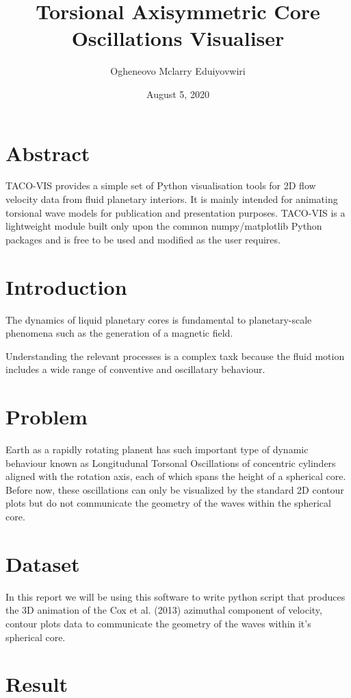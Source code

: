 \documentclass{article}
\title{Torsional Axisymmetric Core Oscillations Visualiser}
\author{Ogheneovo Mclarry Eduiyovwiri}
\date{August 5, 2020}
\begin{document}
\maketitle
\section{Abstract}
TACO-VIS provides a simple set of Python visualisation tools for 2D flow velocity data from fluid planetary interiors. It is mainly intended for animating torsional wave models for publication and presentation purposes. TACO-VIS is a lightweight module built only upon the common numpy/matplotlib Python packages and is free to be used and modified as the user requires.

\section{Introduction}

The dynamics of liquid planetary cores is fundamental to planetary-scale phenomena such as the generation of a magnetic field.

Understanding the relevant processes is a complex taxk because the fluid motion includes a wide range of conventive and oscillatary behaviour.

\section{Problem}
Earth as a rapidly rotating planent has such important type of dynamic behaviour known as Longitudunal Torsonal Oscillations of concentric cylinders aligned with the rotation axis, each of which spans the height of a spherical core.
Before now, these oscillations can only be visualized by the standard 2D contour plots but do not communicate the geometry of the waves within the spherical core.

\section{Dataset}

In this report we will be using this software to write python script that produces the 3D animation of the Cox et al. (2013) azimuthal component of velocity, contour plots data to communicate the geometry of the waves within it's spherical core.

\section{Result}
\end{document}
